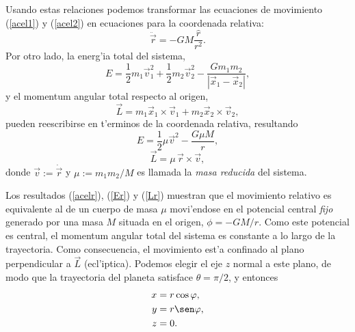Usando estas relaciones podemos transformar las ecuaciones de movimiento (\ref{acel1}) y (\ref{acel2}) en ecuaciones para la coordenada relativa:
\begin{equation}
\ddot{\vec{r}}=-GM\frac{\hat{r}}{r^2} .\label{acelr}
\end{equation}
Por otro lado, la energ'ia total del sistema,
\begin{equation}
E=\frac{1}{2}m_1\vec{v}_1^2+\frac{1}{2}m_2\vec{v}_2^2-\frac{Gm_1m_2}{|\vec{x}_1-\vec{x}_2|},
\end{equation}
y el momentum angular total respecto al origen,
\begin{equation}
\vec{L}=m_1\vec{x}_1\times\vec{v}_1+m_2\vec{x}_2\times\vec{v}_2,
\end{equation}
pueden reescribirse en t'erminos de la coordenada relativa, resultando
\begin{equation}\label{Er}
E=\frac{1}{2}\mu \vec{v}^2-\frac{G\mu M}{r},
\end{equation}
\begin{equation}\label{Lr}
\vec{L}=\mu\,\vec{r}\times\vec{v},
\end{equation}
donde $\vec{v}:=\dot{\vec{r}}$ y $\mu:=m_1m_2/M$ es llamada la \textit{masa reducida} del sistema.

Los resultados (\ref{acelr}), (\ref{Er}) y (\ref{Lr}) muestran que el movimiento relativo es equivalente al de un cuerpo de masa $\mu$ movi'endose en el potencial central \textit{fijo} generado por una masa $M$ situada en el origen, $\phi=-GM/r$. Como este potencial es central, el momentum angular total del sistema es constante a lo largo de la trayectoria. Como consecuencia, el movimiento est'a confinado al plano perpendicular a $\vec{L}$ (ecl'iptica). Podemos elegir el eje $z$ normal a este plano, de modo que la trayectoria del planeta satisface $\theta=\pi/2$, y entonces
\begin{align}
x & = r\cos\varphi ,\\
y & = r\sen\varphi ,\\
z & = 0.
\end{align}

